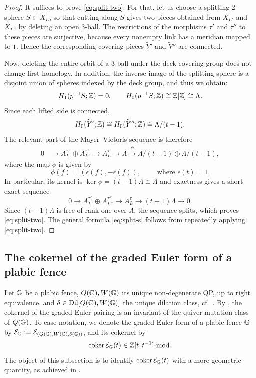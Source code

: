 \begin{proof}
It suffices to prove \eqref{eq:split-two}. For that, let us choose a splitting 2-sphere $S\subset X_L$, so that cutting along $S$ gives two pieces obtained from $X_{L'}$ and $X_{L''}$ by deleting an open $3$-ball.  The restrictions of the morphisms $\tau'$ and $\tau''$ to these pieces are surjective, because every nonempty link has a meridian mapped to $1$.  Hence the corresponding covering pieces $\widetilde Y'$ and $\widetilde Y''$ are connected.

Now, deleting the entire orbit of a $3$-ball under the deck covering group does not change first homology. In addition, the inverse image of the splitting sphere is a disjoint union of spheres indexed by the deck group, and thus we obtain:
\[
   H_1(p^{-1}S;\mathbb Z)=0,
   \qquad
   H_0(p^{-1}S;\mathbb Z)\cong\mathbb Z[\mathbb Z]\cong\Lambda.
\]
Since each lifted side is connected,
\[
   H_0(\widetilde Y';\mathbb Z)
   \cong H_0(\widetilde Y'';\mathbb Z)
   \cong \Lambda/(t-1).
\]
The relevant part of the Mayer--Vietoris sequence is therefore
\begin{align*}
  0&\longrightarrow
  A_{L'}^{\tau'}\oplus A_{L''}^{\tau''}
  \longrightarrow A_L^\tau
  \longrightarrow \Lambda
  \xrightarrow{\phi}
  \Lambda/(t-1)\oplus\Lambda/(t-1),
\end{align*}
where the map $\phi$ is given by
\[
   \phi(f)=(\epsilon(f),-\epsilon(f)),
   \qquad \mbox{ where }\epsilon(t)=1.
\]
In particular, its kernel is $\ker\phi=(t-1)\Lambda\cong\Lambda$ and exactness gives a short exact sequence
\[
  0\longrightarrow
  A_{L'}^{\tau'}\oplus A_{L''}^{\tau''}
  \longrightarrow A_L^\tau
  \longrightarrow (t-1)\Lambda
  \longrightarrow0.
\]
Since $(t-1)\Lambda$ is free of rank one over $\Lambda$, the sequence splits, which proves \eqref{eq:split-two}. The general formula \eqref{eq:split-s} follows from repeatedly applying \eqref{eq:split-two}.
\end{proof}


\subsection{The cokernel of the graded Euler form of a plabic fence}\label{ssec:polynomial_plabic_fence} Let $\mathbb G$ be a plabic fence, $Q(\mathbb G),W(\mathbb G)$ its unique non-degenerate QP, up to right equivalence, and $\delta\in\operatorname{Dil}[Q(\mathbb G),W(\mathbb G)]$ the unique dilation class, cf.~. By , the cokernel of the graded Euler pairing is an invariant of the quiver mutation class of $Q(\mathbb G)$. To ease notation, we denote the graded Euler form of a plabic fence $\mathbb G$ by $\mathcal E_\mathbb G:=\mathcal E_{(Q(\mathbb G),W(\mathbb G),\delta(\mathbb G))}$, and its cokernel by
\begin{equation}\label{eq:dilation_module}
\operatorname{coker}\mathcal E_{\mathbb G}(t)\in\mathbb Z[t,t^{-1}]\mbox{-mod}.
\end{equation}
The object of this subsection is to identify $\operatorname{coker}\mathcal E_{\mathbb G}(t)$ with a more geometric quantity, as achieved in .\\

